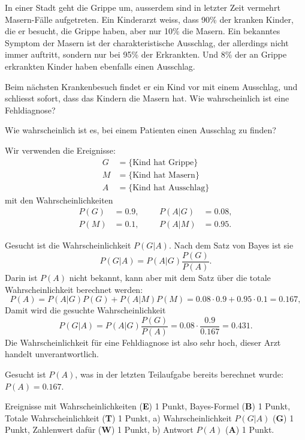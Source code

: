 In einer Stadt geht die Grippe um, ausserdem sind in letzter Zeit
vermehrt Masern-Fälle aufgetreten.
Ein Kinderarzt weiss, dass 90\% der kranken Kinder, die er besucht,
die Grippe haben, aber nur 10\% die Masern.
Ein bekanntes Symptom der Masern ist der charakteristische Ausschlag,
der allerdings nicht immer auftritt, sondern nur bei 95\% der Erkrankten.
Und 8\% der an Grippe erkrankten Kinder haben ebenfalls einen Ausschlag.
\begin{teilaufgaben}
\item
Beim nächsten Krankenbesuch findet er ein Kind vor mit einem Ausschlag,
und schliesst sofort, dass das Kindern die Masern hat.
Wie wahrscheinlich ist eine Fehldiagnose?
\item
Wie wahrscheinlich ist es, bei einem Patienten einen Ausschlag zu finden?
\end{teilaufgaben}


\begin{loesung}
Wir verwenden die Ereignisse:
\begin{align*}
G&=\{\text{Kind hat Grippe}\}\\
M&=\{\text{Kind hat Masern}\}\\
A&=\{\text{Kind hat Ausschlag}\}
\end{align*}
mit den Wahrscheinlichkeiten
\[
\begin{aligned}
P(G)&=0.9,&&&P(A|G)&=0.08,\\
P(M)&=0.1,&&&P(A|M)&=0.95.
\end{aligned}
\]
\begin{teilaufgaben}
\item
Gesucht ist die Wahrscheinlichkeit $P(G|A)$.
Nach dem Satz von Bayes ist sie
\[
P(G|A)=P(A|G)\frac{P(G)}{P(A)}.
\]
Darin ist $P(A)$ nicht bekannt, kann aber mit dem Satz über die totale
Wahrscheinlichkeit berechnet werden:
\[
P(A)=P(A|G)P(G)+P(A|M)P(M)=0.08\cdot 0.9 + 0.95\cdot 0.1=0.167,
\]
Damit wird die gesuchte Wahrscheinlichkeit
\[
P(G|A)=P(A|G)\frac{P(G)}{P(A)}=0.08\cdot\frac{0.9}{0.167}=0.431.
\]
Die Wahrscheinlichkeit für eine Fehldiagnose ist also sehr hoch,
dieser Arzt handelt unverantwortlich.
\item Gesucht ist $P(A)$, was in der letzten Teilaufgabe bereits
berechnet wurde: $P(A)=0.167$.
\qedhere
\end{teilaufgaben}
\end{loesung}

\begin{bewertung}
Ereignisse mit Wahrscheinlichkeiten ({\bf E}) 1 Punkt,
Bayes-Formel ({\bf B}) 1 Punkt,
Totale Wahrscheinlichkeit ({\bf T}) 1 Punkt,
a) Wahrscheinlichkeit $P(G|A)$ ({\bf G}) 1 Punkt, 
Zahlenwert dafür ({\bf W}) 1 Punkt,
b) Antwort $P(A)$ ({\bf A}) 1 Punkt.
\end{bewertung}





